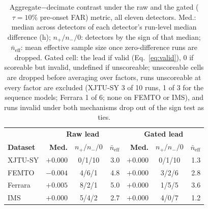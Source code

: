 \begin{table}[t] \footnotesize
	\begin{center}
	\caption{Aggregate$-$decimate contrast under the raw and the gated ($\tau=10\%$ pre-onset FAR) metric, all eleven detectors. Med.: median across detectors of each detector's run-level median difference (h); $n_+/n_-/0$: detectors by the sign of that median; $\bar{n}_{\text{eff}}$: mean effective sample size once zero-difference runs are dropped. Gated cell: the lead if valid (Eq.~\ref{eq:valid}), 0 if scoreable but invalid, undefined if unscoreable; unscoreable cells are dropped before averaging over factors, runs unscoreable at every factor are excluded (XJTU-SY 3 of 10 runs, 1 of 3 for the sequence models; Ferrara 1 of 6; none on FEMTO or IMS), and runs invalid under both mechanisms drop out of the sign test as ties.}
	\label{tab:gatedcontrast}
	\setlength{\tabcolsep}{3pt}
	\begin{tabular}{l r c r | r c r}
		\hline \hline
		 & \multicolumn{3}{c|}{\textbf{Raw lead}} & \multicolumn{3}{c}{\textbf{Gated lead}} \\
		\textbf{Dataset} & \textbf{Med.} & $n_+/n_-/0$ & $\bar{n}_{\text{eff}}$ & \textbf{Med.} & $n_+/n_-/0$ & $\bar{n}_{\text{eff}}$ \\
		\hline
		XJTU-SY & $+0.000$ & 0/1/10 & 3.0 & $+0.000$ & 0/1/10 & 1.3 \\
		FEMTO & $-0.004$ & 4/6/1 & 4.8 & $+0.000$ & 3/2/6 & 2.8 \\
		Ferrara & $+0.005$ & 8/2/1 & 5.0 & $+0.000$ & 1/5/5 & 3.6 \\
		IMS & $+0.000$ & 5/4/2 & 2.7 & $+0.000$ & 4/0/7 & 1.2 \\
		\hline \hline
	\end{tabular}
	\end{center}
\end{table}
